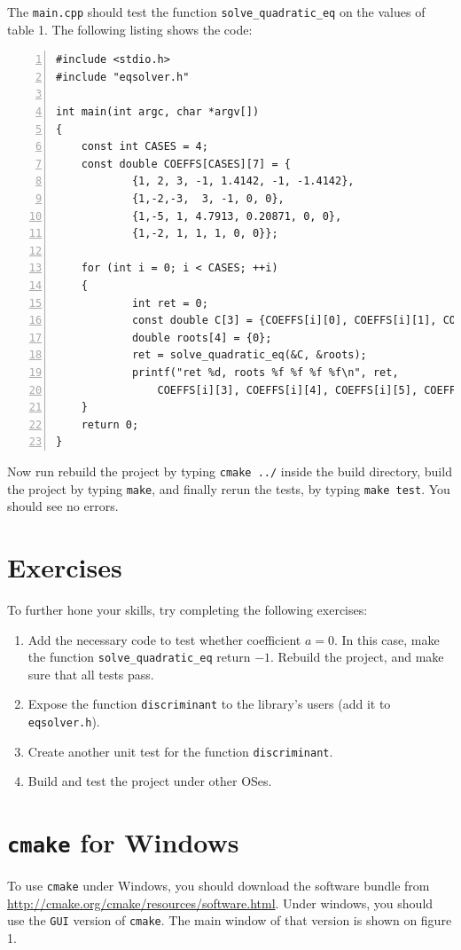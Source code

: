 \documentclass[12pt,a4paper]{article}
\begin{document}
The \verb+main.cpp+ should test the function \verb+solve_quadratic_eq+ on the values of table 1. The following listing shows the code:
\begin{lstlisting}[basicstyle=\small, numbers=left,caption=main.cpp,columns=flexible,keywordstyle=\color{black}\ttfamily]
#include <stdio.h>
#include "eqsolver.h"

int main(int argc, char *argv[])
{
	const int CASES = 4;
	const double COEFFS[CASES][7] = {
			{1, 2, 3, -1, 1.4142, -1, -1.4142},
			{1,-2,-3,  3, -1, 0, 0},
			{1,-5, 1, 4.7913, 0.20871, 0, 0},
			{1,-2, 1, 1, 1, 0, 0}};

	for (int i = 0; i < CASES; ++i)
	{
			int ret = 0;
			const double C[3] = {COEFFS[i][0], COEFFS[i][1], COEFFS[i][2]};
			double roots[4] = {0};
			ret = solve_quadratic_eq(&C, &roots);
			printf("ret %d, roots %f %f %f %f\n", ret, 
				COEFFS[i][3], COEFFS[i][4], COEFFS[i][5], COEFFS[i][6]);
	}
	return 0;
}
\end{lstlisting}

Now run rebuild the project by typing \verb+cmake ../+ inside the build directory, build the project by typing \verb+make+, and finally rerun the tests, by typing \verb+make test+. You should see no errors.
\section{Exercises}
To further hone your skills, try completing the following exercises:
\begin{enumerate}
\item Add the necessary code to test whether coefficient $a=0$. In this case, make the function \verb+solve_quadratic_eq+ return $-1$. Rebuild the project, and make sure that all tests pass.
\item Expose the function \verb+discriminant+ to the library's users (add it to \verb+eqsolver.h+).
\item Create another unit test for the function \verb+discriminant+. 
\item Build and test the project under other OSes. 
\end{enumerate}

\section{\texttt{cmake} for Windows}
To use \verb+cmake+ under Windows, you should download the software bundle from \href{http://cmake.org/cmake/resources/software.html}{http://cmake.org/cmake/resources/software.html}. Under windows, you should use the \verb+GUI+ version of \verb+cmake+. The main window of that version is shown on figure 1.
\end{document}
